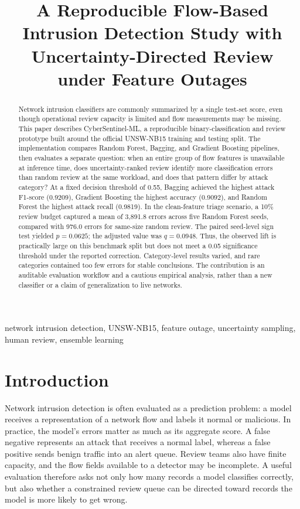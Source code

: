 \documentclass[conference]{IEEEtran}
\title{A Reproducible Flow-Based Intrusion Detection Study with Uncertainty-Directed Review under Feature Outages}
\author{\IEEEauthorblockN{Your Name}
\IEEEauthorblockA{Department or Program\\
University or Institution\\
City, Country\\
email@example.com}}
\begin{document}
\maketitle

\begin{abstract}
Network intrusion classifiers are commonly summarized by a single test-set score, even though operational review capacity is limited and flow measurements may be missing. This paper describes CyberSentinel-ML, a reproducible binary-classification and review prototype built around the official UNSW-NB15 training and testing split. The implementation compares Random Forest, Bagging, and Gradient Boosting pipelines, then evaluates a separate question: when an entire group of flow features is unavailable at inference time, does uncertainty-ranked review identify more classification errors than random review at the same workload, and does that pattern differ by attack category? At a fixed decision threshold of 0.55, Bagging achieved the highest attack F1-score (0.9209), Gradient Boosting the highest accuracy (0.9092), and Random Forest the highest attack recall (0.9819). In the clean-feature triage scenario, a 10\% review budget captured a mean of 3,891.8 errors across five Random Forest seeds, compared with 976.0 errors for same-size random review. The paired seed-level sign test yielded $p=0.0625$; the adjusted value was $q=0.0948$. Thus, the observed lift is practically large on this benchmark split but does not meet a 0.05 significance threshold under the reported correction. Category-level results varied, and rare categories contained too few errors for stable conclusions. The contribution is an auditable evaluation workflow and a cautious empirical analysis, rather than a new classifier or a claim of generalization to live networks.
\end{abstract}

\begin{IEEEkeywords}
network intrusion detection, UNSW-NB15, feature outage, uncertainty sampling, human review, ensemble learning
\end{IEEEkeywords}

\section{Introduction}
Network intrusion detection is often evaluated as a prediction problem: a model receives a representation of a network flow and labels it normal or malicious. In practice, the model's errors matter as much as its aggregate score. A false negative represents an attack that receives a normal label, whereas a false positive sends benign traffic into an alert queue. Review teams also have finite capacity, and the flow fields available to a detector may be incomplete. A useful evaluation therefore asks not only how many records a model classifies correctly, but also whether a constrained review queue can be directed toward records the model is more likely to get wrong.
\end{document}
